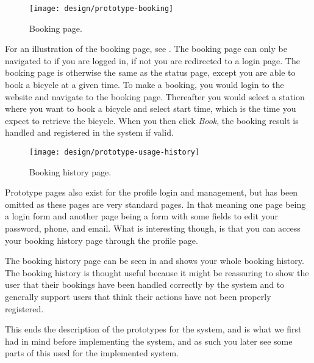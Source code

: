 \begin{figure}[h]
	\centering
	\texttt{[image: design/prototype-booking]}
	\caption{Booking page.}\label{fig:prototype-book}
\end{figure}

For an illustration of the booking page, see .
The booking page can only be navigated to if you are logged in, if not you are redirected to a login page.
The booking page is otherwise the same as the status page, except you are able to book a bicycle at a given time.
To make a booking, you would login to the website and navigate to the booking page.
Thereafter you would select a station where you want to book a bicycle and select start time, which is the time you expect to retrieve the bicycle.
When you then click \textit{Book}, the booking result is handled and registered in the system if valid.

\begin{figure}[h]
	\centering
	\texttt{[image: design/prototype-usage-history]}
	\caption{Booking history page.}\label{fig:prototype-usage-history}
\end{figure}

Prototype pages also exist for the profile login and management, but has been omitted as these pages are very standard pages.
In that meaning one page being a login form and another page being a form with some fields to edit your password, phone, and email.
What is interesting though, is that you can access your booking history page through the profile page.

The booking history page can be seen in  and shows your whole booking history.
The booking history is thought useful because it might be reassuring to show the user that their bookings have been handled correctly by the system and to generally support users that think their actions have not been properly registered.

This ends the description of the prototypes for the system, and is what we first had in mind before implementing the system, and as such you later see some parts of this used for the implemented system.